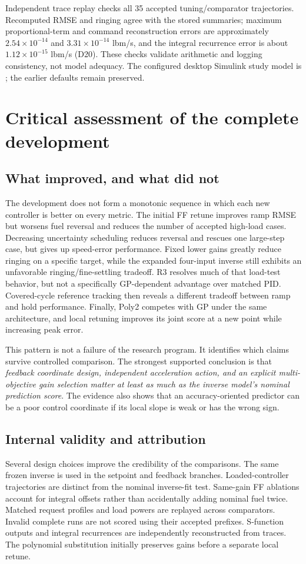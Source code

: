 \documentclass[11pt,a4paper,oneside]{report}
\begin{document}
Independent trace replay checks all 35 accepted tuning/comparator trajectories. Recomputed RMSE and ringing agree with the stored summaries; maximum proportional-term and command reconstruction errors are approximately $2.54\times10^{-14}$ and $3.31\times10^{-14}$ lbm/s, and the integral recurrence error is about $1.12\times10^{-15}$ lbm/s (D20). These checks validate arithmetic and logging consistency, not model adequacy. The configured desktop Simulink study model is ; the earlier defaults remain preserved.

\chapter{Critical assessment of the complete development}
\section{What improved, and what did not}
The development does not form a monotonic sequence in which each new controller is better on every metric. The initial FF retune improves ramp RMSE but worsens fuel reversal and reduces the number of accepted high-load cases. Decreasing uncertainty scheduling reduces reversal and rescues one large-step case, but gives up speed-error performance. Fixed lower gains greatly reduce ringing on a specific target, while the expanded four-input inverse still exhibits an unfavorable ringing/fine-settling tradeoff. R3 resolves much of that load-test behavior, but not a specifically GP-dependent advantage over matched PID. Covered-cycle reference tracking then reveals a different tradeoff between ramp and hold performance. Finally, Poly2 competes with GP under the same architecture, and local retuning improves its joint score at a new point while increasing peak error.

This pattern is not a failure of the research program. It identifies which claims survive controlled comparison. The strongest supported conclusion is that \emph{feedback coordinate design, independent acceleration action, and an explicit multi-objective gain selection matter at least as much as the inverse model's nominal prediction score}. The evidence also shows that an accuracy-oriented predictor can be a poor control coordinate if its local slope is weak or has the wrong sign.

\section{Internal validity and attribution}
Several design choices improve the credibility of the comparisons. The same frozen inverse is used in the setpoint and feedback branches. Loaded-controller trajectories are distinct from the nominal inverse-fit test. Same-gain FF ablations account for integral offsets rather than accidentally adding nominal fuel twice. Matched request profiles and load powers are replayed across comparators. Invalid complete runs are not scored using their accepted prefixes. S-function outputs and integral recurrences are independently reconstructed from traces. The polynomial substitution initially preserves gains before a separate local retune.
\end{document}
